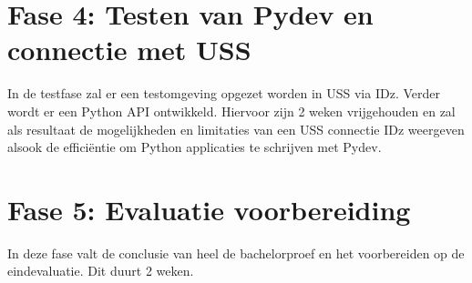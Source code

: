 \section{Fase 4: Testen van Pydev en connectie met USS}
\label{sec:m-verdere-configuratie}
In de testfase zal er een testomgeving opgezet worden in USS via IDz. Verder wordt er een Python API ontwikkeld. Hiervoor zijn 2 weken vrijgehouden en zal als resultaat de mogelijkheden en limitaties van een USS connectie IDz weergeven alsook de efficiëntie om Python applicaties te schrijven met Pydev. 
%    

\section{Fase 5: Evaluatie voorbereiding}
\label{sec:m-evaluatie-voorbereiding}
In deze fase valt de conclusie van heel de bachelorproef en het voorbereiden op de eindevaluatie. Dit duurt 2 weken.


